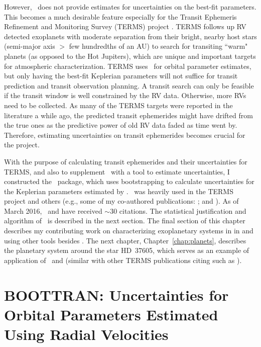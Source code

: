 However, \rvlin\ does not provide estimates for uncertainties on
the best-fit parameters. This becomes a much desirable feature
especially for the Transit Ephemeris Refinement and Monitoring Survey
(TERMS) project \citep{Kane2009}. TERMS follows up RV detected
exoplanets with moderate separation from their bright, nearby host
stars (semi-major axis $>$ few hundredths of an AU) to search for
transiting ``warm" planets (as opposed to the Hot Jupiters), which are
unique and important targets for atmospheric characterization. TERMS
uses \rvlin\ for orbital parameter estimates, but only having the
best-fit Keplerian parameters will not suffice for transit prediction
and transit observation planning. A transit search can only be
feasible if the transit window is well constrained by the RV
data. Otherwise, more RVs need to be collected. As many of the TERMS
targets were reported in the literature a while ago, the predicted
transit ephemerides might have drifted from the true ones as the
predictive power of old RV data faded as time went by. Therefore,
estimating uncertainties on transit ephemerides becomes crucial for
the project.

With the purpose of calculating transit ephemerides and their
uncertainties for TERMS, and also to supplement \rvlin\ with a tool to
estimate uncertainties, I constructed the \boottran\ package, which
uses bootstrapping to calculate uncertainties for the Keplerian
parameters estimated by \rvlin. \boottran\ was heavily used in the
TERMS project and others (e.g., some of my co-authored publications:
\citealt{2013ApJ...768..155H, 2012ApJ...754...37D,
  2011ApJ...737...58K, 2011ApJ...735L..41K}; and
\citealt{2015ApJ...800...22F}). As of March 2016, \boottran\ and
\cite{wang2012} have received $\sim$30 citations. The statistical
justification and algorithm of \boottran\ is described in the next
section. The final section of this chapter describes my contributing
work on characterizing exoplanetary systems in in
\cite{2015ApJ...800...22F} and \cite{2013ApJ...768..155H} using other
tools besides \boottran. The next chapter, Chapter~\ref{chap:planets},
describes the planetary system around the star HD~37605, which serves
as an example of application of \rvlin\ and \boottran (similar with
other TERMS publications citing \citealt{wang2012} such as
\citealt{2012ApJ...754...37D}).


\section{BOOTTRAN: Uncertainties for Orbital Parameters Estimated
  Using Radial Velocities}\label{boottran:sec:boottran}

